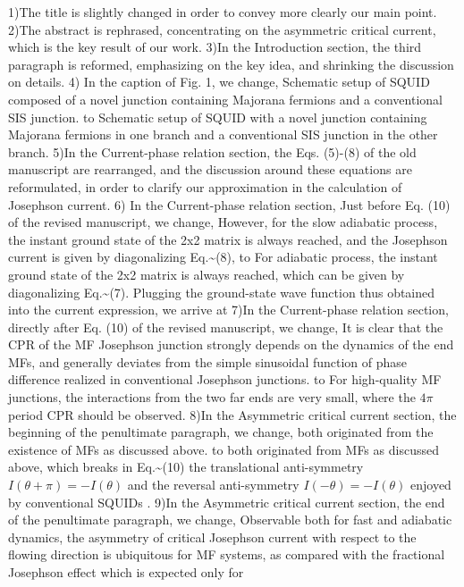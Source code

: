 \documentclass[11pt]{article}
\begin{document}
1)The title is slightly changed in order to convey more clearly our main
point. 2)The abstract is rephrased, concentrating on the asymmetric
critical current, which is the key result of our work. 3)In the
Introduction section, the third paragraph is reformed, emphasizing on
the key idea, and shrinking the discussion on details. 4) In the caption
of Fig. 1, we change, Schematic setup of SQUID composed of a novel
junction containing Majorana fermions and a conventional SIS junction.
to Schematic setup of SQUID with a novel junction containing Majorana
fermions in one branch and a conventional SIS junction in the other
branch. 5)In the Current-phase relation section, the Eqs. (5)-(8) of the
old manuscript are rearranged, and the discussion around these equations
are reformulated, in order to clarify our approximation in the
calculation of Josephson current. 6) In the Current-phase relation
section, Just before Eq. (10) of the revised manuscript, we change,
However, for the slow adiabatic process, the instant ground state of the
2x2 matrix is always reached, and the Josephson current is given by
diagonalizing Eq.\textasciitilde{}(8), to For adiabatic process, the
instant ground state of the 2x2 matrix is always reached, which can be
given by diagonalizing Eq.\textasciitilde{}(7). Plugging the
ground-state wave function thus obtained into the current expression, we
arrive at 7)In the Current-phase relation section, directly after Eq.
(10) of the revised manuscript, we change, It is clear that the CPR of
the MF Josephson junction strongly depends on the dynamics of the end
MFs, and generally deviates from the simple sinusoidal function of phase
difference realized in conventional Josephson junctions. to For
high-quality MF junctions, the interactions from the two far ends are
very small, where the \(4\pi\) period CPR should be observed. 8)In the
Asymmetric critical current section, the beginning of the penultimate
paragraph, we change, both originated from the existence of MFs as
discussed above. to both originated from MFs as discussed above, which
breaks in Eq.\textasciitilde{}(10) the translational anti-symmetry
\(I(\theta+\pi)=-I(\theta)\) and the reversal anti-symmetry
\(I(-\theta)=-I(\theta)\) enjoyed by conventional SQUIDs
\cite{quintero}. 9)In the Asymmetric critical current section, the end
of the penultimate paragraph, we change, Observable both for fast and
adiabatic dynamics, the asymmetry of critical Josephson current with
respect to the flowing direction is ubiquitous for MF systems, as
compared with the fractional Josephson effect which is expected only for
\end{document}
